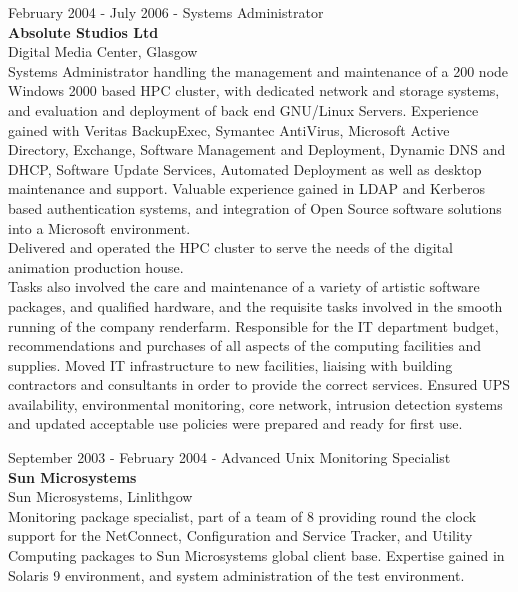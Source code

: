 \documentclass[10pt]{report}
\begin{document}
\begin{flushleft}
February 2004 - July 2006 - Systems Administrator\\
{\bf Absolute Studios Ltd}\\
Digital Media Center, Glasgow\\
Systems Administrator handling the management and maintenance of a 200 node Windows 2000 based HPC cluster, with dedicated network and storage systems, and evaluation and deployment of back end GNU/Linux Servers. Experience gained with Veritas BackupExec, Symantec AntiVirus, Microsoft Active Directory, Exchange, Software Management and Deployment, Dynamic DNS and DHCP, Software Update Services, Automated Deployment as well as desktop maintenance and support. Valuable experience gained in LDAP and Kerberos based authentication systems, and integration of Open Source software solutions into a Microsoft environment. \\
Delivered and operated the HPC cluster to serve the needs of the digital animation production house.\\
Tasks also involved the care and maintenance of a variety of artistic software packages, and qualified hardware, and the requisite tasks involved in the smooth running of the company renderfarm. Responsible for the IT department budget, recommendations and purchases of all aspects of the computing facilities and supplies. Moved IT infrastructure to new facilities, liaising with building contractors and consultants in order to provide the correct services. Ensured UPS availability, environmental monitoring, core network, intrusion detection systems and updated acceptable use policies were prepared and ready for first use.\\
\end{flushleft}


\begin{flushleft}
September 2003 - February 2004 - Advanced Unix Monitoring Specialist\\
{\bf Sun Microsystems}\\
Sun Microsystems, Linlithgow\\
Monitoring package specialist, part of a team of 8 providing round the clock support for the NetConnect, Configuration and Service Tracker, and Utility Computing packages to Sun Microsystems global client base. Expertise gained in Solaris 9 environment, and system administration of the test environment.\\
\end{flushleft}
\end{document}
